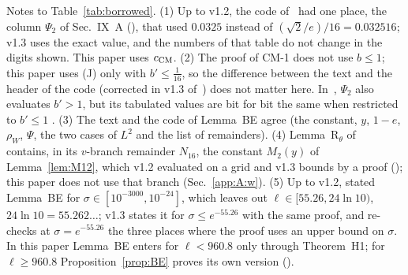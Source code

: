 Notes to Table~\ref{tab:borrowed}.
(1) Up to v1.2, the code of~\cite{H} had one place, the column $\Psi_2$ of Sec.~IX~A (), that used $0.0325$ instead of $(\sqrt2/e)/16=0.032516$; v1.3 uses the exact value, and the numbers of that table do not change in the digits shown. This paper uses $c_{\rm CM}$.
(2) The proof of CM-1 does not use $b\le1$; this paper uses (J) only with $b'\le\frac1{16}$, so the difference between the text and the header of the code (corrected in v1.3 of~\cite{H}) does not matter here. In~\cite{H}, $\Psi_2$ also evaluates $b'>1$, but its tabulated values are bit for bit the same when restricted to $b'\le1$ \numst.
(3) The text and the code of Lemma~BE agree (the constant, $y$, $1-e$, $\rho_W$, $\Psi$, the two cases of $L^2$ and the list of remainders).
(4) Lemma~R$_\theta$ of~\cite{H} contains, in its $v$-branch remainder $N_{16}$, the constant $M_2(y)$ of Lemma~\ref{lem:M12}, which v1.2 evaluated on a grid and v1.3 bounds by a proof (); this paper does not use that branch (Sec.~\ref{app:A:w}).
(5) Up to v1.2, \cite{H} stated Lemma~BE for $\sigma\in[10^{-3000},10^{-24}]$, which leaves out $\ell\in[55.26,24\ln10)$, $24\ln10=55.262\ldots$; v1.3 states it for $\sigma\le e^{-55.26}$ with the same proof, and re-checks at $\sigma=e^{-55.26}$ the three places where the proof uses an upper bound on $\sigma$. In this paper Lemma~BE enters for $\ell<960.8$ only through Theorem~H1; for $\ell\ge960.8$ Proposition~\ref{prop:BE} proves its own version ().
